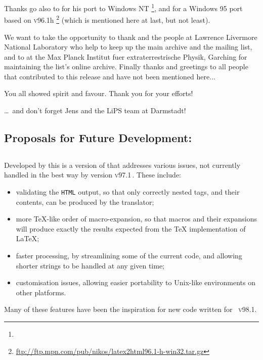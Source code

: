 \smallskip\noindent
Thanks go also to \Popineau{} for his port to Windows NT
\footnote{},
and \NikosDrakos{} for a Windows 95 port based on \textsc{v96.1}h
\footnote{\url{ftp://ftp.mpn.com/pub/nikos/latex2html96.1-h-win32.tar.gz}}
(which is mentioned here at last, but not least).

\medskip\noindent
We want to take the opportunity to thank \Nelson{} and the people at
Lawrence Livermore National Laboratory who help to keep up the
\latextohtml{} main archive and the mailing list, and to \Bohnet{} at
the Max Planck Institut fuer extraterrestrische Physik, Garching for
maintaining the list's online archive.
Finally thanks and greetings to all people that contributed to this
release and have not been mentioned here...

\medskip\noindent
You all showed spirit and favour. Thank you for your efforts!

\medskip
\begin{flushright}
\dots\ and don't forget Jens and the LiPS team at Darmstadt!
\end{flushright}

\clearpage
\subsection*{Proposals for Future Development:\label{future}}%



\subsection*{\latextohtmlNG}
Developed by \Hennecke\label{latex2htmlNG} this is a version of
\latextohtml{} that addresses various issues,
not currently handled in the best way by version \textsc{v97.1}\,.
These include:
\begin{itemize}
\item validating the \texttt{HTML} output,
so that only correctly nested tags, and their contents,
can be produced by the translator;
%
\item more \TeX-like order of macro-expansion,
so that macros and their expansions will produce exactly
the results expected from the \TeX{} implementation of \LaTeX;
%
\item faster processing,
by streamlining some of the current \Perl{} code, and allowing
shorter strings to be handled at any given time;
%
\item customisation issues,
allowing easier portability to Unix-like environments on
other platforms.
%
\end{itemize}
Many of these features have been the inspiration for new code
written for \latextohtml~\textsc{v98.1}.

